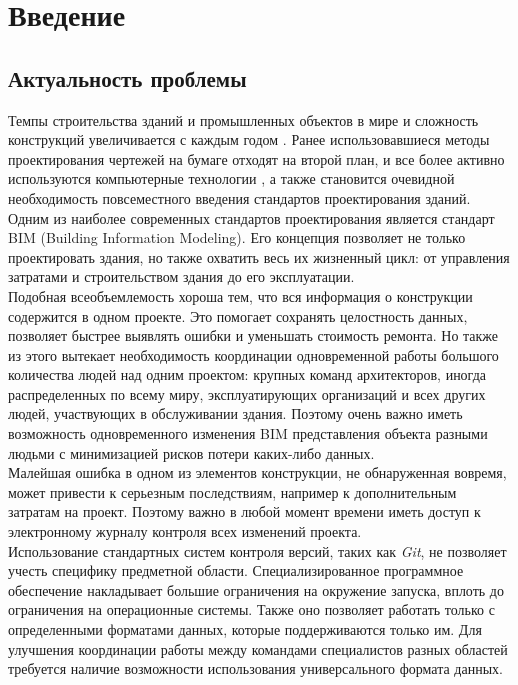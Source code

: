 \documentclass[a4paper,14pt]{extreport} %
\begin{document}
\tableofcontents %

\newpage
\chapter{Введение}
\section{Актуальность проблемы}

Темпы строительства зданий и промышленных объектов в мире и сложность конструкций увеличивается с каждым годом \cite{BUILDING_GROWTH_RATE}. Ранее использовавшиеся методы проектирования чертежей на бумаге отходят на второй план, и все более активно используются компьютерные технологии \cite{BUILDING_SOFTWARE}, а также становится очевидной необходимость повсеместного введения стандартов проектирования зданий. \\
Одним из наиболее современных стандартов проектирования является стандарт BIM (Building Information Modeling)\cite{BIM_FUTURE}. Его концепция позволяет не только проектировать здания, но также охватить весь их жизненный цикл: от управления затратами и строительством здания до его эксплуатации. \\
Подобная всеобъемлемость хороша тем, что вся информация о конструкции содержится в одном проекте. Это помогает сохранять целостность данных, позволяет быстрее выявлять ошибки и уменьшать стоимость ремонта. Но также из этого вытекает необходимость координации одновременной работы большого количества людей над одним проектом: крупных команд архитекторов, иногда распределенных по всему миру, эксплуатирующих организаций и всех других людей, участвующих в обслуживании здания. Поэтому очень важно иметь возможность одновременного изменения BIM представления объекта разными людьми с минимизацией рисков потери каких-либо данных. \\
Малейшая ошибка в одном из элементов конструкции, не обнаруженная вовремя, может привести к серьезным последствиям, например к дополнительным затратам на проект. Поэтому важно в любой момент времени иметь доступ к электронному журналу контроля всех изменений проекта. \\
Использование стандартных систем контроля версий, таких как \textit{Git}, не позволяет учесть специфику предметной области. Специализированное программное обеспечение накладывает большие ограничения на окружение запуска, вплоть до ограничения на операционные системы. Также оно позволяет работать только с определенными форматами данных, которые поддерживаются только им. Для улучшения координации работы между командами специалистов разных областей требуется наличие возможности использования универсального формата данных.
\end{document}
